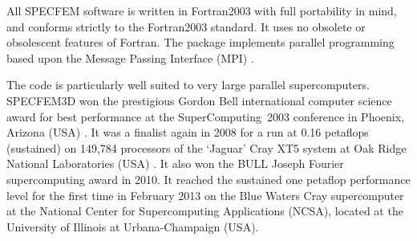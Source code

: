 \clearpage

All SPECFEM software is written in Fortran2003 with full portability
in mind, and conforms strictly to the Fortran2003 standard. It uses
no obsolete or obsolescent features of Fortran. The package implements parallel
programming based upon the Message Passing Interface (MPI) \citep{GrLuSk94,Pac97}.

The code is particularly well suited to very large parallel supercomputers.
SPECFEM3D won the prestigious Gordon Bell international computer science award for best performance at the SuperComputing~2003
conference in Phoenix, Arizona (USA) \citep{KoTsChTr03}.
It was a finalist again in 2008 for a run at 0.16 petaflops (sustained) on 149,784 processors
of the `Jaguar' Cray XT5 system at Oak Ridge National Laboratories
(USA) \citep{CaKoLaTiMiLeSnTr08}. It also won the BULL Joseph Fourier supercomputing award in 2010.
It reached the sustained one petaflop performance level for the first time in February 2013
on the Blue Waters Cray supercomputer at the National Center for Supercomputing Applications (NCSA), located at the University of Illinois at Urbana-Champaign (USA).

